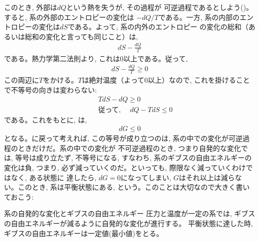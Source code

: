 このとき, 外部は$dQ$という熱を失うが, その過程が
可逆過程であるとしよう()。すると, 系の外部のエントロピーの変化は
$-dQ/T$である。一方, 系の内部のエントロピーの変化は$dS$である。よって, 系の内外のエントロピー
の変化の総和（あるいは総和の変化と言っても同じこと）は, 
\begin{eqnarray}
dS-\frac{dQ}{T}
\end{eqnarray}
である。熱力学第二法則より, これは0以上である。従って, 
\begin{eqnarray}
dS-\frac{dQ}{T}\ge 0\label{eq:Gibbs_explain4}
\end{eqnarray}
この両辺に$T$をかける。$T$は絶対温度（よって0以上）なので, これを掛けることで不等号の向きは変わらない:
\begin{eqnarray}
&&TdS-dQ\ge 0\\
&&\text{従って, 　}dQ-TdS\le 0
\end{eqnarray}
である。これをもとに, は, 
\begin{eqnarray}
dG\le 0\label{eq:dGle0}
\end{eqnarray}
となる。に戻って考えれば, この等号が成り立つのは, 
系の中での変化が可逆過程のときだけだ。系の中での変化が
不可逆過程のとき, つまり自発的な変化では, 等号は成り立たず, 
不等号になる, すなわち, 系のギブスの自由エネルギーの変化は負, つまり, 
必ず減っていくのだ。といっても, 際限なく減っていくわけではなく, ある状態に
達したら, $dG=0$になってしまい, $G$はそれ以上は減らない。このとき, 
系は平衡状態にある, という。このことは大切なので大きく書いておこう:

\begin{itembox}{系の自発的な変化とギブスの自由エネルギー}
圧力と温度が一定の系では, ギブスの自由エネルギーが減るように自発的な変化が進行する。
平衡状態に達した時, ギブスの自由エネルギーは一定値(最小値)をとる。
\end{itembox}
\mv

